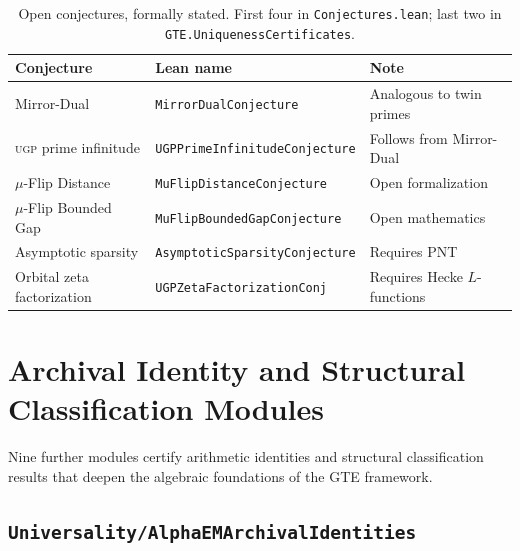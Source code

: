 \documentclass[11pt,a4paper]{article}
\theoremstyle{definition}
\newcommand{\ugp}{\textsc{ugp}}
\begin{document}
\begin{table}[ht]
\centering
\caption{Open conjectures, formally stated.  First four in \texttt{Conjectures.lean};
last two in \texttt{GTE.UniquenessCertificates}.}
\label{tab:conjectures}
\begin{tabular}{@{}p{4.2cm}p{5.2cm}p{4.2cm}@{}}
\toprule
\textbf{Conjecture} & \textbf{Lean name} & \textbf{Note} \\
\midrule
Mirror-Dual           & \lstinline|MirrorDualConjecture|            & Analogous to twin primes \\
\ugp{} prime infinitude & \lstinline|UGPPrimeInfinitudeConjecture|  & Follows from Mirror-Dual \\
$\mu$-Flip Distance   & \lstinline|MuFlipDistanceConjecture|        & Open formalization \\
$\mu$-Flip Bounded Gap & \lstinline|MuFlipBoundedGapConjecture|     & Open mathematics \\
Asymptotic sparsity   & \lstinline|AsymptoticSparsityConjecture|    & Requires PNT \\
Orbital zeta factorization & \lstinline|UGPZetaFactorizationConj|  & Requires Hecke $L$-functions \\
\bottomrule
\end{tabular}
\end{table}

\section{Archival Identity and Structural Classification Modules}\label{sec:archival-identity}

Nine further modules certify arithmetic identities and structural classification
results that deepen the algebraic foundations of the GTE framework.

\subsection{\texttt{Universality/AlphaEMArchivalIdentities}}\label{subsec:alphaem-archival}
\end{document}

